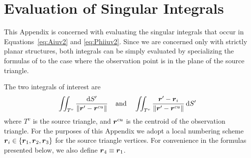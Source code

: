 \documentclass[
letterpaper, %
11pt, %
oneside, 
onecolumn, %
openany, %
]{memoir}
\numberwithin{equation}{chapter}
\numberwithin{figure}{chapter}
\begin{document}
\chapter{\label{app:singint}Evaluation of Singular Integrals}
 This Appendix is concerned with evaluating the singular integrals 
 that occur in 
 Equations~\eqref{eq:Aiuv2} and \eqref{eq:Phiiuv2}.  Since we are concerned
 only with strictly planar structures, both integrals can be simply
 evaluated by specializing the formulas of \cite{wrgs:84} to the case where
 the observation point is in the plane of the source triangle.
 
 The two integrals of interest are
 \begin{align}
   \iint_{T^v} \frac{\text{d} S'}{\left\lVert\boldsymbol{r}' - \boldsymbol{r}^{cu}\right\rVert} \;\;\;\; \text{and} \;\;\;\;
   \iint_{T^v} \frac{\boldsymbol{r}'-\boldsymbol{r}_i}{\left\lVert\boldsymbol{r}' - \boldsymbol{r}^{cu}\right\rVert} \, \text{d} S'
   \label{eq:twoints}
 \end{align}
 where $T^v$ is the source triangle, and $\boldsymbol{r}^{cu}$ is the centroid of the observation 
 triangle.  For the purposes of this Appendix we adopt a local numbering scheme 
 $\boldsymbol{r}_i \in \{\boldsymbol{r}_1,\boldsymbol{r}_2,\boldsymbol{r}_3\}$ for the source triangle vertices.  For convenience in the
 formulas presented below, we also define $\boldsymbol{r}_4 \equiv \boldsymbol{r}_1$.
 
\end{document}
